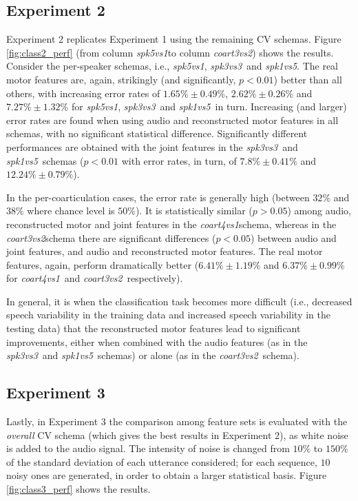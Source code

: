 \documentclass{pnastwo}
\newcommand{\spka}{\emph{spk5vs1}}
\newcommand{\spkb}{\emph{spk3vs3}}
\newcommand{\spkc}{\emph{spk1vs5}}
\newcommand{\coa}{\emph{coart4vs1}}
\newcommand{\cob}{\emph{coart3vs2}}
\begin{document}
\begin{article}
\subsection{Experiment 2}
\label{subsec:exp2}

Experiment 2 replicates Experiment 1 using the remaining CV schemas.
Figure \ref{fig:class2_perf} (from column \spka to column \cob) shows the results.
Consider the per-speaker schemas, i.e., \spka, \spkb\ and \spkc. The real motor
features are, again, strikingly (and significantly, $p<0.01$) better than all others,
with increasing error rates of
$1.65\% \pm 0.49\%$,
$2.62\% \pm 0.26\%$ and
$7.27\% \pm 1.32\%$ for \spka, \spkb\ and \spkc\ in turn. Increasing (and larger) error
rates are found when using audio and reconstructed motor features in all schemas, with
no significant statistical difference. Significantly different performances are obtained
with the joint features in the \spkb\ and \spkc\ schemas ($p<0.01$ with error rates, in turn,
of $7.8\% \pm 0.41\%$ and $12.24\% \pm 0.79\%$).

In the per-coarticulation cases, the error rate is generally high (between $32\%$ and $38\%$
where chance level is $50\%$). It is statistically similar ($p>0.05$) among audio, reconstructed
motor and joint features in the \coa schema, whereas in the \cob schema there are significant 
differences ($p<0.05$) between audio and joint features, and audio and reconstructed motor features.
The real motor features, again, perform dramatically better
($6.41\% \pm 1.19\%$ and $6.37\% \pm 0.99\%$ for \coa\ and \cob\ respectively).

In general, it is when the classification task becomes more difficult (i.e., decreased speech variability in the 
 training data and increased speech variability in the testing data) that the reconstructed motor features 
lead to significant improvements, either when combined with the audio features (as in the \spkb\ and \spkc\ 
schemas) or alone (as in the \cob\ schema).

\subsection{Experiment 3}
\label{subsec:exp3}

Lastly, in Experiment 3 the comparison among feature sets is evaluated with the
\emph{overall} CV schema (which gives the best results in Experiment 2), as white noise is added
to the audio signal. The intensity of noise is changed from $10\%$ to $150\%$ of
the standard deviation of each utterance considered; for each sequence, $10$ noisy
ones are generated, in order to obtain a larger statistical basis.
Figure \ref{fig:class3_perf} shows the results.


\end{article}
\end{document}
